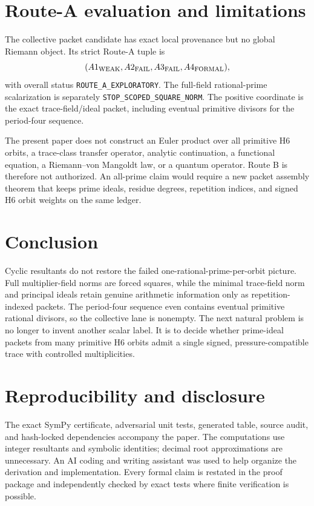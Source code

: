 \documentclass[11pt]{article}
\theoremstyle{definition}\newtheorem{definition}[theorem]{Definition}
\theoremstyle{remark}\newtheorem{remark}[theorem]{Remark}
\begin{document}
\section{Route-A evaluation and limitations}

The collective packet candidate has exact local provenance but no global
Riemann object.  Its strict Route-A tuple is
\[
(A1_{\rm WEAK},A2_{\rm FAIL},A3_{\rm FAIL},A4_{\rm FORMAL}),
\]
with overall status \texttt{ROUTE\_A\_EXPLORATORY}.  The full-field
rational-prime scalarization is separately
\texttt{STOP\_SCOPED\_SQUARE\_NORM}.  The positive coordinate is the exact
trace-field/ideal packet, including eventual primitive divisors for the
period-four sequence.

The present paper does not construct an Euler product over all primitive H6
orbits, a trace-class transfer operator, analytic continuation, a functional
equation, a Riemann--von Mangoldt law, or a quantum operator.  Route B is
therefore not authorized.  An all-prime claim would require a new packet
assembly theorem that keeps prime ideals, residue degrees, repetition
indices, and signed H6 orbit weights on the same ledger.

\section{Conclusion}

Cyclic resultants do not restore the failed one-rational-prime-per-orbit
picture.  Full multiplier-field norms are forced squares, while the minimal
trace-field norm and principal ideals retain genuine arithmetic information
only as repetition-indexed packets.  The period-four sequence even contains
eventual primitive rational divisors, so the collective lane is nonempty.
The next natural problem is no longer to invent another scalar label.  It is
to decide whether prime-ideal packets from many primitive H6 orbits admit a
single signed, pressure-compatible trace with controlled multiplicities.

\section*{Reproducibility and disclosure}

The exact SymPy certificate, adversarial unit tests, generated table, source
audit, and hash-locked dependencies accompany the paper.  The computations
use integer resultants and symbolic identities; decimal root approximations
are unnecessary.  An AI coding and writing assistant was used to help
organize the derivation and implementation.  Every formal claim is restated
in the proof package and independently checked by exact tests where finite
verification is possible.



\end{document}
